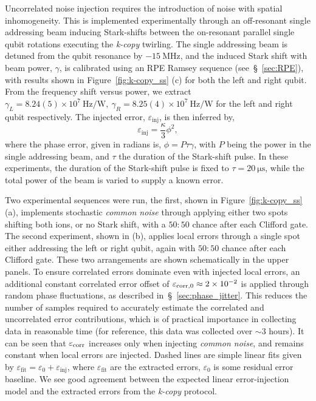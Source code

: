Uncorrelated noise injection requires the introduction of noise with
spatial inhomogeneity. This is implemented experimentally through an
off-resonant single addressing beam inducing Stark-shifts between the
on-resonant parallel single qubit rotations executing the \emph{k-copy}
twirling. The single addressing beam is detuned from the
qubit resonance by $-15~\unit{\mega\hertz}$, and the induced Stark shift with beam power, $\gamma$, is calibrated using an RPE Ramsey sequence (see~\S~\ref{sec:RPE}), with results shown in Figure~\ref{fig:k-copy_ss} (c) for both the left and right qubit.
From the frequency shift versus power, we extract $\gamma_L=8.24(5)\times10^7~\unit{\hertz\per\watt},~\gamma_R=8.25(4)\times10^7~\unit{\hertz\per\watt}$ for the left and right qubit respectively.
The injected error,
$\varepsilon_\mathrm{inj}$, is then inferred by,
\begin{equation}
    \varepsilon_\mathrm{inj} = \frac{\kappa}{3}\phi^2,
\end{equation}
where the phase error, given in radians is,
$\phi = P\tau\gamma$, with $P$ being the power in the single addressing beam, and $\tau$ the duration of the Stark-shift pulse. 
In these experiments, the duration of the Stark-shift pulse is fixed to $\tau=20~\unit{\micro\second}$, while the total power of the beam is varied to supply a known error.

Two experimental sequences were run, the first, shown
in Figure~\ref{fig:k-copy_ss}(a), implements stochastic \textit{common noise} through
applying either two spots shifting both ions, or no Stark shift, with a $50:50$
chance after each Clifford gate. The second experiment, shown in (b), applies
local errors through a single spot either addressing the left or right qubit,
again with $50:50$ chance after each Clifford gate. These two arrangements are
shown schematically in the upper panels. 
To ensure correlated errors dominate even with injected local errors, an
additional constant correlated error offset of $\varepsilon_{\rm corr,0}\approx 2\times10^{-2}$ is applied through random phase
fluctuations, as described in~\S~\ref{sec:phase_jitter}. This reduces the number
of samples required to accurately estimate the correlated and uncorrelated error
contributions, which is of practical importance in collecting data in reasonable
time (for reference, this data was collected over $\sim 3$ hours). 
It can be
seen that $\varepsilon_{\rm corr}$ increases only when injecting
\textit{common noise}, and remains constant when local errors are injected.
Dashed lines are simple linear fits given by
$\varepsilon_\mathrm{fit}=\varepsilon_0+\varepsilon_\mathrm{inj}$, where
$\varepsilon_\mathrm{fit}$ are the extracted errors, $\varepsilon_0$ is some
residual error baseline. We see good agreement between the expected linear error-injection model and the extracted errors from the \emph{k-copy} protocol.


